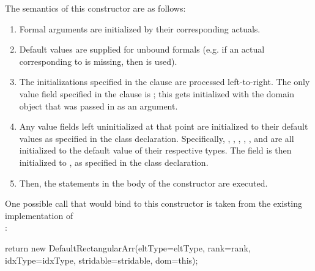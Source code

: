 The semantics of this constructor are as follows:
\begin{enumerate}
\item Formal arguments are initialized by their corresponding actuals.
\item Default values are supplied for unbound formals (e.g. if an actual corresponding to
   is missing, then  is used).
\item The initializations specified in the  clause are processed
  left-to-right.  The only value field specified in the  clause is ;
  this gets initialized with the domain object that was passed in as an argument.
\item Any value fields left uninitialized at that point are initialized to their default
  values as specified in the class declaration.  Specifically, , ,
  , , ,  and  are
  all initialized to the default value of their respective types.  The
   field is then initialized to , as specified in the class
  declaration.
\item Then, the statements in the body of the constructor are executed.
\end{enumerate}

One possible call that would bind to this constructor is taken from the existing
implementation of\\
:
\begin{chapel}
      return new DefaultRectangularArr(eltType=eltType, rank=rank, idxType=idxType,
                                      stridable=stridable, dom=this);
\end{chapel}


%
%
%

